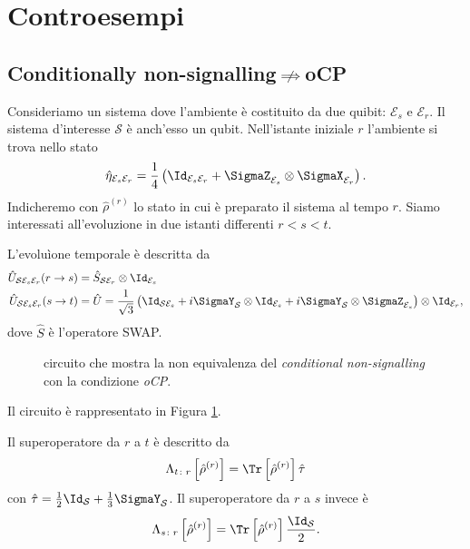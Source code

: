 \documentclass[a4]{article}
\begin{document}
\section{Controesempi}
\subsection[Cond. non-signalling does not imply oCP]
           {Conditionally non-signalling\(\centernot\implies\)oCP} \label{cont:cnsocp}
Consideriamo un sistema dove l'ambiente è costituito da due quibit: \(\mathcal{E}_s\) e
\(\mathcal{E}_r\). Il sistema d'interesse \(\mathcal{S}\) è anch'esso un qubit.
Nell'istante iniziale \(r\) l'ambiente si trova nello stato
\[\hat{\eta}_{\mathcal{E}_s\mathcal{E}_r} =
  \frac{1}{4}\left(\Id_{\mathcal{E}_s\mathcal{E}_r} +
                    \SigmaZ_{\mathcal{E}_s} \otimes \SigmaX_{\mathcal{E}_r}
             \right). \]
Indicheremo con \(\hat{\rho}^{(r)}\) lo stato in cui è preparato il sistema al tempo \(r\).
Siamo interessati all'evoluzione in due istanti differenti \(r<s<t\).

L'evoluìone temporale è descritta da
\begin{align*}
	\hat{U}_{\mathcal{S}\mathcal{E}_s\mathcal{E}_r}(r \to s) &= 
	  \hat{S}_{\mathcal{S}\mathcal{E}_r} \otimes \Id_{\mathcal{E}_s} \\
	\hat{U}_{\mathcal{S}\mathcal{E}_s\mathcal{E}_r}(s \to t) &=
	  \hat{U} = \frac{1}{\sqrt{3}}\left(\Id_{\mathcal{S}\mathcal{E}_s} +
	    	                            i \SigmaY_{\mathcal{S}} \otimes \Id_{\mathcal{E}_s} +
	    	                            i \SigmaY_{\mathcal{S}} \otimes \SigmaZ_{\mathcal{E}_s}
	    	                      \right) \otimes \Id_{\mathcal{E}_r},    	    	                              
\end{align*}
dove \(\hat{S}\) è l'operatore SWAP.
\begin{figure}
	\centering
	
	\caption{circuito che mostra la non equivalenza del \emph{conditional non-signalling}
		con la condizione \emph{oCP}.}
	\label{fig:cnsNocp}
\end{figure}
Il circuito è rappresentato in Figura \ref{fig:cnsNocp}.

Il superoperatore da \(r\) a \(t\) è descritto da 
\[\Lambda_{t\colon r} \left[\hat{\rho}^{(r)}\right] =
    \Tr\left[\hat{\rho}^{(r)}\right] \hat{\tau} \]
con \(\hat{\tau} = \frac{1}{2}\Id_\mathcal{S} + \frac{1}{3}\SigmaY_\mathcal{S}\).
Il superoperatore da \(r\) a \(s\) invece è 
\[\Lambda_{s\colon r} \left[\hat{\rho}^{(r)}\right] =
    \Tr\left[\hat{\rho}^{(r)}\right] \frac{\Id_\mathcal{S}}{2}. \]
    
\end{document}
